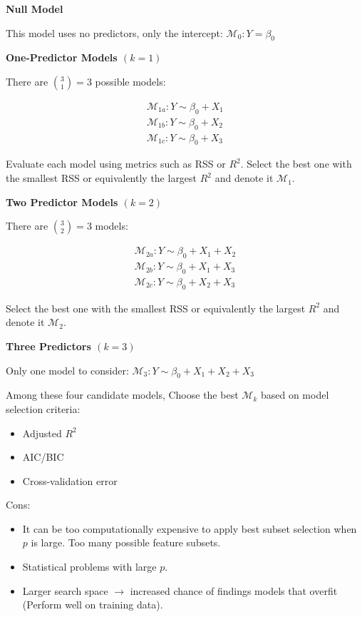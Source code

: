 \step \textbf{Null Model}

This model uses no predictors, only the intercept: $\mathcal{M}_0: Y = \beta_0$

\step \textbf{One-Predictor Models $(k=1)$}

There are $\binom{3}{1} = 3$ possible models:

\begin{align*}
    \mathcal{M}_{1a}: Y \sim \beta_0 +X_1\\
    \mathcal{M}_{1b}: Y \sim \beta_0 +X_2\\
    \mathcal{M}_{1c}: Y \sim \beta_0 +X_3
\end{align*}

Evaluate each model using metrics such as RSS or $R^2$.
Select the best one with the smallest RSS or equivalently the largest $R^2$ and denote it $\mathcal{M}_1$.

\step \textbf{Two Predictor Models $(k=2)$}

There are $\binom{3}{2}=3$ models:

\begin{align*}
    \mathcal{M}_{2a}: Y\sim \beta_0 + X_1+ X_2\\
    \mathcal{M}_{2b}: Y\sim \beta_0 + X_1+ X_3\\
    \mathcal{M}_{2c}: Y\sim \beta_0 + X_2+ X_3
\end{align*}

Select the best one with the smallest RSS or equivalently the largest $R^2$ and denote it $\mathcal{M}_2$.

\step \textbf{Three Predictors $(k=3)$}

Only one model to consider: $\mathcal{M}_3 : Y\sim \beta_0+X_1+X_2+X_3$

\bigskip 

Among these four candidate models, Choose the best $\mathcal{M}_k$ based on model selection criteria:

\begin{itemize}
    \item Adjusted $R^2$
    \item AIC/BIC
    \item Cross-validation error
\end{itemize}

Cons:

\begin{itemize}
    \item It can be too computationally expensive to apply best subset selection when $p$ is large. Too many possible feature subsets.
    \item Statistical problems with large $p$.
    \item Larger search space $\xrightarrow{}$ increased chance of findings models that overfit (Perform well on training data).
\end{itemize}

